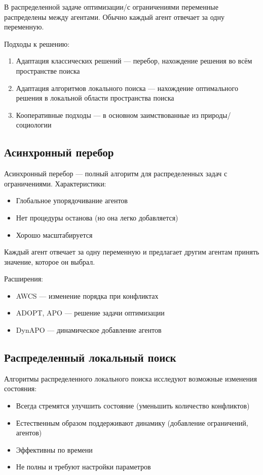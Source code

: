 В распределенной задаче оптимизации/с ограничениями переменные распределены между агентами. Обычно каждый агент отвечает за одну переменную.

Подходы к решению:

\begin{enumerate}
  \item Адаптация классических решений — перебор, нахождение решения во всём пространстве поиска
  \item Адаптация алгоритмов локального поиска — нахождение оптимального решения в локальной области пространства поиска
  \item Кооперативные подходы — в основном заимствованные из природы/социологии
\end{enumerate}

\subsection{Асинхронный перебор}

Асинхронный перебор — полный алгоритм для распределенных задач с ограничениями. Характеристики:

\begin{itemize}
  \item Глобальное упорядочивание агентов
  \item Нет процедуры останова (но она легко добавляется)
  \item Хорошо масштабируется
\end{itemize}

Каждый агент отвечает за одну переменную и предлагает другим агентам принять значение, которое он выбрал.

Расширения:

\begin{itemize}
  \item AWCS — изменение порядка при конфликтах
  \item ADOPT, APO — решение задачи оптимизации
  \item DynAPO — динамическое добавление агентов
\end{itemize}

\subsection{Распределенный локальный поиск}

Алгоритмы распределенного локального поиска исследуют возможные изменения состояния:

\begin{itemize}
  \item Всегда стремятся улучшить состояние (уменьшить количество конфликтов)
  \item Естественным образом поддерживают динамику (добавление ограничений, агентов)
  \item Эффективны по времени
  \item Не полны и требуют настройки параметров
\end{itemize}

